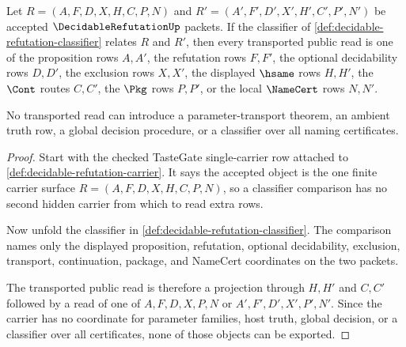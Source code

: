 \begin{theorem}
\label{thm:decidable-refutation-classifier-transport}
Let $R=(A,F,D,X,H,C,P,N)$ and $R'=(A',F',D',X',H',C',P',N')$ be accepted $\DecidableRefutationUp$ packets. If the classifier of \autoref{def:decidable-refutation-classifier} relates $R$ and $R'$, then every transported public read is one of the proposition rows $A,A'$, the refutation rows $F,F'$, the optional decidability rows $D,D'$, the exclusion rows $X,X'$, the displayed $\hsame$ rows $H,H'$, the $\Cont$ routes $C,C'$, the $\Pkg$ rows $P,P'$, or the local $\NameCert$ rows $N,N'$.

No transported read can introduce a parameter-transport theorem, an ambient truth row, a global decision procedure, or a classifier over all naming certificates.
\end{theorem}
\begin{proof}
Start with the checked TasteGate single-carrier row attached to \autoref{def:decidable-refutation-carrier}. It says the accepted object is the one finite carrier surface $R=(A,F,D,X,H,C,P,N)$, so a classifier comparison has no second hidden carrier from which to read extra rows.

Now unfold the classifier in \autoref{def:decidable-refutation-classifier}. The comparison names only the displayed proposition, refutation, optional decidability, exclusion, transport, continuation, package, and NameCert coordinates on the two packets.

The transported public read is therefore a projection through $H,H'$ and $C,C'$ followed by a read of one of $A,F,D,X,P,N$ or $A',F',D',X',P',N'$. Since the carrier has no coordinate for parameter families, host truth, global decision, or a classifier over all certificates, none of those objects can be exported.
\end{proof}

